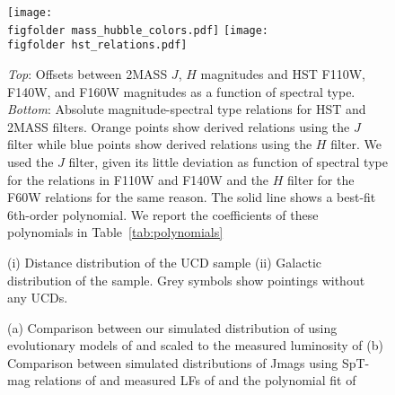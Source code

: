 \documentclass[manuscript]{aastex63}
\begin{document}
%
\begin{figure}
    \centering
    \texttt{[image: \\figfolder mass\_hubble\_colors.pdf]}
    \texttt{[image: \\figfolder hst\_relations.pdf]}
    \caption{\textit{Top}: Offsets between 2MASS $J$, $H$ magnitudes and HST F110W, F140W, and F160W magnitudes as a function of spectral type.
    \textit{Bottom}: Absolute  magnitude-spectral type relations for HST and 2MASS filters. Orange points show derived relations using the $J$ filter while blue points show derived relations using the $H$ filter. We used the $J$ filter, given its little deviation as function of spectral type for the relations in F110W and F140W and the $H$ filter for the F60W relations for the same reason. The solid line shows a best-fit 6th-order polynomial. We report the coefficients of these polynomials in Table~\ref{tab:polynomials}}
    \label{fig:absmagrelations}
\end{figure}

\begin{figure}
    \centering
    \caption{ (i) Distance distribution of the UCD sample
    (ii) Galactic distribution of the sample. Grey symbols show pointings without any UCDs.}
    \label{fig:candidedistances}
\end{figure}


\begin{figure}
\centering
{}
\caption{(a) Comparison between our simulated distribution of \teff using evolutionary models of \cite{2008ApJ...689.1327S} and 
\cite{2003A&A...402..701B} scaled to the measured luminosity of \cite{2019ApJS..240...19K} (b) Comparison between simulated distributions of Jmags using SpT-mag relations of \cite{2012ApJS..201...19D} and measured LFs of \cite{2019arXiv190604166B,2007astro.ph..2034C} and the polynomial fit of \cite{2016AJ....151...92R}}
\label{fig:lf}
\end{figure}

\end{document}
